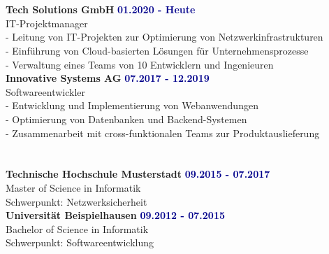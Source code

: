 \documentclass[a4paper,10pt]{article}
\begin{document}
\hfill
\begin{minipage}[t]{0.64\textwidth} %

\section*{\strExperience}
\textbf{Tech Solutions GmbH} \hfill \textcolor{darkblue}{\textbf{01.2020 - Heute}}\\
IT-Projektmanager\\
- Leitung von IT-Projekten zur Optimierung von Netzwerkinfrastrukturen\\
- Einführung von Cloud-basierten Lösungen für Unternehmensprozesse\\
- Verwaltung eines Teams von 10 Entwicklern und Ingenieuren\\[2em]

\textbf{Innovative Systems AG} \hfill \textcolor{darkblue}{\textbf{07.2017 - 12.2019}}\\
Softwareentwickler\\
- Entwicklung und Implementierung von Webanwendungen\\
- Optimierung von Datenbanken und Backend-Systemen\\
- Zusammenarbeit mit cross-funktionalen Teams zur Produktauslieferung\\

\vspace{3.5em}

\section*{\strEducation}
\textbf{Technische Hochschule Musterstadt} \hfill \textcolor{darkblue}{\textbf{09.2015 - 07.2017}}\\
Master of Science in Informatik\\ 
Schwerpunkt: Netzwerksicherheit\\[2em]
\textbf{Universität Beispielhausen} \hfill \textcolor{darkblue}{\textbf{09.2012 - 07.2015}}\\
Bachelor of Science in Informatik\\
Schwerpunkt: Softwareentwicklung\\[2em]

\end{minipage} %
\end{document}
